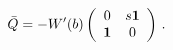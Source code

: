 \begin{equation}
\bar Q =-
W'(b)\left(\begin{array}{cc} 0&s{\bf 1}\\
{\bf 1} &0 \end{array}\right)\,.
\end{equation}

